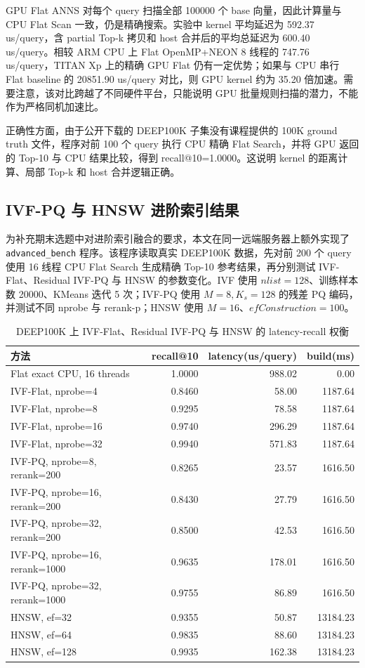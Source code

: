 \documentclass[UTF8,a4paper,10pt]{ctexart}
\begin{document}
GPU Flat ANNS 对每个 query 扫描全部 100000 个 base 向量，因此计算量与 CPU Flat Scan 一致，仍是精确搜索。实验中 kernel 平均延迟为 592.37 us/query，含 partial Top-k 拷贝和 host 合并后的平均总延迟为 600.40 us/query。相较 ARM CPU 上 Flat OpenMP+NEON 8 线程的 747.76 us/query，TITAN Xp 上的精确 GPU Flat 仍有一定优势；如果与 CPU 串行 Flat baseline 的 20851.90 us/query 对比，则 GPU kernel 约为 35.20 倍加速。需要注意，该对比跨越了不同硬件平台，只能说明 GPU 批量规则扫描的潜力，不能作为严格同机加速比。

正确性方面，由于公开下载的 DEEP100K 子集没有课程提供的 100K ground truth 文件，程序对前 100 个 query 执行 CPU 精确 Flat Search，并将 GPU 返回的 Top-10 与 CPU 结果比较，得到 recall@10=1.0000。这说明 kernel 的距离计算、局部 Top-k 和 host 合并逻辑正确。

\subsection{IVF-PQ 与 HNSW 进阶索引结果}

为补充期末选题中对进阶索引融合的要求，本文在同一远端服务器上额外实现了 \texttt{advanced\_bench} 程序。该程序读取真实 DEEP100K 数据，先对前 200 个 query 使用 16 线程 CPU Flat Search 生成精确 Top-10 参考结果，再分别测试 IVF-Flat、Residual IVF-PQ 与 HNSW 的参数变化。IVF 使用 $nlist=128$、训练样本数 20000、KMeans 迭代 5 次；IVF-PQ 使用 $M=8, K_s=128$ 的残差 PQ 编码，并测试不同 nprobe 与 rerank-p；HNSW 使用 $M=16$、$efConstruction=100$。

\begin{table}[H]
\centering
\caption{DEEP100K 上 IVF-Flat、Residual IVF-PQ 与 HNSW 的 latency-recall 权衡}
\label{tab:advanced_ann_results}
\begin{tabular}{lrrr}
\toprule
方法 & recall@10 & latency(us/query) & build(ms) \\
\midrule
Flat exact CPU, 16 threads & 1.0000 & 988.02 & 0.00 \\
IVF-Flat, nprobe=4 & 0.8460 & 58.00 & 1187.64 \\
IVF-Flat, nprobe=8 & 0.9295 & 78.58 & 1187.64 \\
IVF-Flat, nprobe=16 & 0.9740 & 296.29 & 1187.64 \\
IVF-Flat, nprobe=32 & 0.9940 & 571.83 & 1187.64 \\
IVF-PQ, nprobe=8, rerank=200 & 0.8265 & 23.57 & 1616.50 \\
IVF-PQ, nprobe=16, rerank=200 & 0.8430 & 27.79 & 1616.50 \\
IVF-PQ, nprobe=32, rerank=200 & 0.8500 & 42.53 & 1616.50 \\
IVF-PQ, nprobe=16, rerank=1000 & 0.9635 & 178.01 & 1616.50 \\
IVF-PQ, nprobe=32, rerank=1000 & 0.9755 & 86.89 & 1616.50 \\
HNSW, ef=32 & 0.9355 & 50.87 & 13184.23 \\
HNSW, ef=64 & 0.9835 & 88.60 & 13184.23 \\
HNSW, ef=128 & 0.9935 & 162.38 & 13184.23 \\
\bottomrule
\end{tabular}
\end{table}
\end{document}
